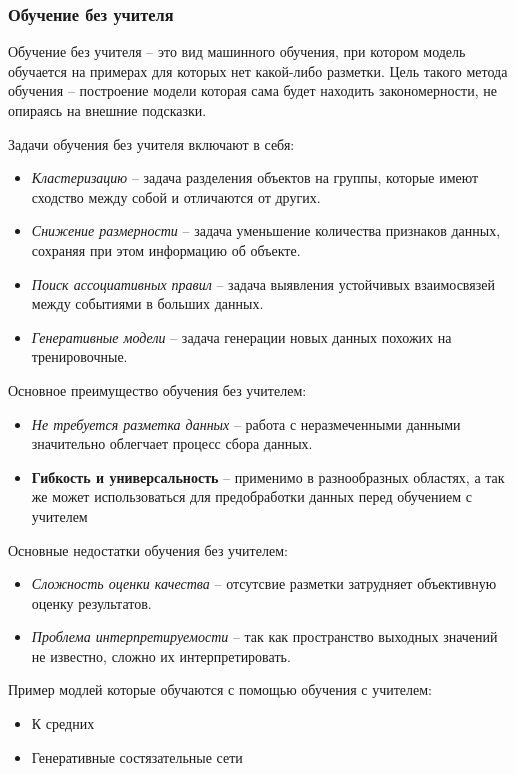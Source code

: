\documentclass[../part_1.tex]{subfiles}
\begin{document}
\subsubsection{Обучение без учителя} %
    \label{sec:without_teacher}
    \par Обучение без учителя --  это вид машинного обучения, при котором модель обучается на примерах для которых нет какой-либо разметки. Цель такого метода обучения -- построение модели которая сама будет находить закономерности, не опираясь на внешние подсказки. 
    \par Задачи обучения без учителя включают в себя:
    \begin{itemize}
        \item \textit{Кластеризацию} -- задача разделения объектов на группы, которые имеют сходство между собой и отличаются от других.
        \item \textit{Снижение размерности} -- задача уменьшение количества признаков данных, сохраняя при этом информацию об объекте.
        \item \textit{Поиск ассоциативных правил} -- задача выявления устойчивых взаимосвязей между событиями в больших данных.
        \item \textit{Генеративные модели} -- задача генерации новых данных похожих на тренировочные.
    \end{itemize}
    \par Основное преимущество обучения без учителем:
    \begin{itemize}
        \item \textit{Не требуется разметка данных} -- работа с неразмеченными данными значительно облегчает процесс сбора данных.
        \item \textbf{Гибкость и универсальность} -- применимо в разнообразных областях, а так же может использоваться для предобработки данных перед обучением с учителем
    \end{itemize}
    \par Основные недостатки обучения без учителем:
    \begin{itemize}
        \item \textit{Сложность оценки качества} -- отсутсвие разметки затрудняет объективную оценку результатов.
        \item \textit{Проблема интерпретируемости} -- так как пространство выходных значений не известно, сложно их интерпретировать. 
    \end{itemize}
    \par Пример модлей которые обучаются с помощью обучения с учителем:
    \begin{itemize}
        \item К средних
        \item Генеративные состязательные сети
    \end{itemize}
\end{document}
